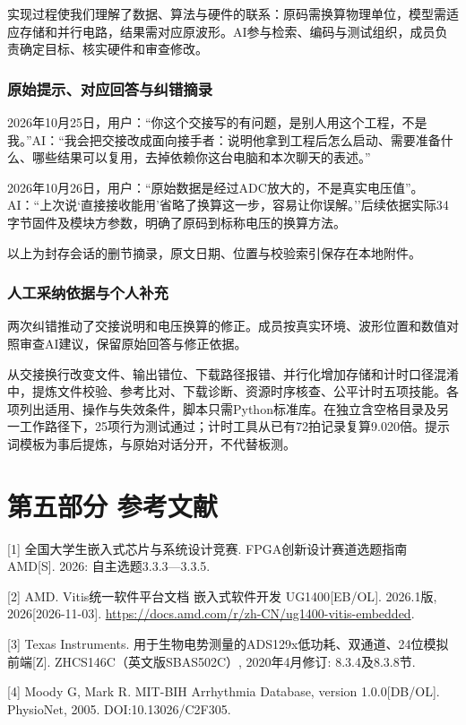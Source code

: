 \documentclass[UTF8,12pt,a4paper,fontset=none]{ctexart}
\begin{document}
实现过程使我们理解了数据、算法与硬件的联系：原码需换算物理单位，模型需适应存储和并行电路，结果需对应原波形。AI参与检索、编码与测试组织，成员负责确定目标、核实硬件和审查修改。

\subsubsection{原始提示、对应回答与纠错摘录}

2026年10月25日，用户：``你这个交接写的有问题，是别人用这个工程，不是我。''AI：``我会把交接改成面向接手者：说明他拿到工程后怎么启动、需要准备什么、哪些结果可以复用，去掉依赖你这台电脑和本次聊天的表述。''

2026年10月26日，用户：``原始数据是经过ADC放大的，不是真实电压值''。AI：``上次说`直接接收能用'省略了换算这一步，容易让你误解。''后续依据实际34字节固件及模块方参数，明确了原码到标称电压的换算方法。

以上为封存会话的删节摘录，原文日期、位置与校验索引保存在本地附件。

\subsubsection{人工采纳依据与个人补充}

两次纠错推动了交接说明和电压换算的修正。成员按真实环境、波形位置和数值对照审查AI建议，保留原始回答与修正依据。

从交接换行改变文件、输出错位、下载路径报错、并行化增加存储和计时口径混淆中，提炼文件校验、参考比对、下载诊断、资源时序核查、公平计时五项技能。各项列出适用、操作与失效条件，脚本只需Python标准库。在独立含空格目录及另一工作路径下，25项行为测试通过；计时工具从已有72拍记录复算9.020倍。提示词模板为事后提炼，与原始对话分开，不代替板测。

\section{第五部分 参考文献}

{[}1{]} 全国大学生嵌入式芯片与系统设计竞赛. FPGA创新设计赛道选题指南 AMD{[}S{]}. 2026: 自主选题3.3.3---3.3.5.

{[}2{]} AMD. Vitis统一软件平台文档 嵌入式软件开发 UG1400{[}EB/OL{]}. 2026.1版, 2026{[}2026-11-03{]}. \url{https://docs.amd.com/r/zh-CN/ug1400-vitis-embedded}.

{[}3{]} Texas Instruments. 用于生物电势测量的ADS129x低功耗、双通道、24位模拟前端{[}Z{]}. ZHCS146C（英文版SBAS502C）, 2020年4月修订: 8.3.4及8.3.8节.

{[}4{]} Moody G, Mark R. MIT-BIH Arrhythmia Database, version 1.0.0{[}DB/OL{]}. PhysioNet, 2005. DOI:10.13026/C2F305.
\end{document}

